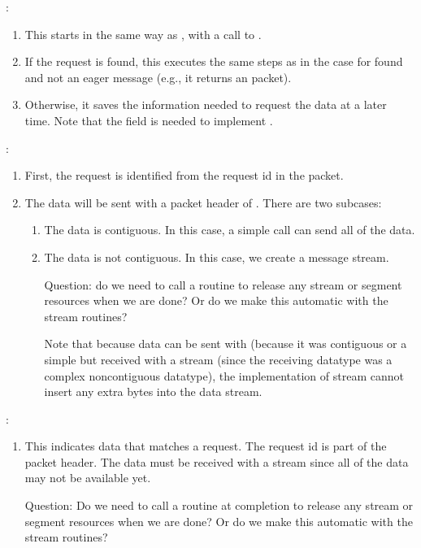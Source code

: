 \begin{enumerate}
\end{enumerate}

:
\begin{enumerate}
\item This starts in the same way as , with a call
  to .  

\item If the request is found, this executes the same steps as in the
   case for found and not an eager message (e.g., it
  returns an  packet).

\item Otherwise, it saves the information needed to request the data at a
  later time. Note
  that the  field is needed to
  implement . 
\end{enumerate}

:
\begin{enumerate}
\item First, the request is identified from the request id in the packet.

\item The data will be sent with a packet header of
  .  There are two subcases:
  \begin{enumerate}
  \item The data is contiguous.  In this case, a simple 
    call can send all of the data.

  \item The data is not contiguous.  In this case, we create a message
    stream.  

   Question: do we need to call a routine to release any stream or segment
   resources when we are done?  Or do we make this automatic with the stream
   routines? 

   Note that because data can be sent with  (because it
   was contiguous or a simple  but received with a stream (since
   the receiving datatype was a complex noncontiguous datatype), the
   implementation of stream cannot insert any extra bytes into the data
   stream.  

  \end{enumerate}
\end{enumerate}

:
\begin{enumerate}
\item This indicates data that matches a request.  The request id is part of
  the packet header.  The data must be received with a stream since all of the
  data may not be available yet.  

  Question: Do we need to call a routine at completion to release any stream
  or segment resources when we are done? Or do we make this automatic with the
  stream routines?

\end{enumerate}

